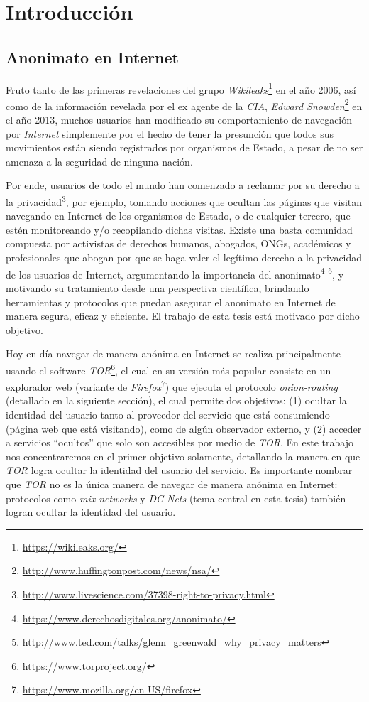 \chapter{Introducción}\label{cap1}

\section{Anonimato en Internet}

Fruto tanto de las primeras revelaciones del grupo 
\emph{Wikileaks}\footnote{\url{https://wikileaks.org/}} en el año 2006, 
así como de la información revelada por el ex agente de la \emph{CIA}, 
\emph{Edward Snowden}\footnote{\url{http://www.huffingtonpost.com/news/nsa/}} 
en el año 2013, muchos usuarios han modificado su comportamiento de navegación 
por \emph{Internet} simplemente por el hecho de tener la presunción que todos 
sus movimientos están siendo registrados por organismos de Estado, a pesar de 
no ser amenaza a la seguridad de ninguna nación.

Por ende, usuarios de todo el mundo han comenzado a reclamar por su derecho a 
la privacidad\footnote{\url{http://www.livescience.com/37398-right-to-privacy.html}}, por ejemplo, tomando 
acciones que ocultan las páginas que visitan navegando en Internet de los 
organismos de Estado, o de cualquier tercero, que estén monitoreando y/o 
recopilando dichas visitas. Existe una basta comunidad compuesta por 
activistas de derechos humanos, abogados, ONGs, académicos y profesionales 
que abogan por que se haga valer el legítimo derecho a la 
privacidad de los usuarios de Internet, argumentando la importancia del 
anonimato\footnote{\url{https://www.derechosdigitales.org/anonimato/}} 
\footnote{\url{http://www.ted.com/talks/glenn_greenwald_why_privacy_matters}}, 
y motivando su tratamiento desde una perspectiva científica, brindando 
herramientas y protocolos que puedan asegurar el anonimato en Internet de 
manera segura, eficaz y eficiente. El trabajo de esta tesis está motivado por 
dicho objetivo.

Hoy en día navegar de manera anónima en Internet se realiza principalmente 
usando el software \emph{TOR}\footnote{\url{https://www.torproject.org/}}, 
el cual en su versión más popular consiste en un explorador web (variante de 
\emph{Firefox}\footnote{\url{https://www.mozilla.org/en-US/firefox}}) que 
ejecuta el protocolo \emph{onion-routing} (detallado en la siguiente sección), 
el cual permite dos objetivos: (1) ocultar la identidad del usuario tanto al 
proveedor del servicio que está consumiendo (página web que está visitando), 
como de algún observador externo, y (2) acceder a servicios ``ocultos'' que 
solo son accesibles por medio de \emph{TOR}. En este trabajo nos 
concentraremos en el primer objetivo solamente, detallando la manera en que 
\emph{TOR} logra ocultar la identidad del usuario del servicio. Es importante 
nombrar que \emph{TOR} no es la única manera de navegar de manera anónima en 
Internet: protocolos como \emph{mix-networks} y \emph{DC-Nets} (tema central 
en esta tesis) también logran ocultar la identidad del usuario.

